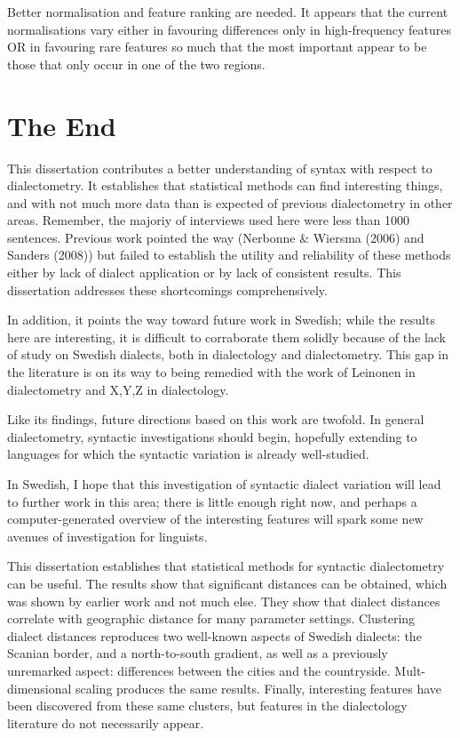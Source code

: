Better normalisation and feature ranking are needed. It appears that
the current normalisations vary either in favouring differences
only in high-frequency features OR in favouring rare features so much
that the most important appear to be those that only occur in one of
the two regions.

\section{The End}

This dissertation contributes a better understanding of syntax with
respect to dialectometry. It establishes that statistical methods can
find interesting things, and with not much more data than is expected
of previous dialectometry in other areas. Remember, the majoriy of
interviews used here were less than 1000 sentences. Previous work
pointed the way (Nerbonne \& Wiersma (2006) and Sanders (2008)) but
failed to establish the utility and reliability of these methods
either by lack of dialect application or by lack of consistent
results. This dissertation addresses these shortcomings
comprehensively.

In addition, it points the way toward future work in Swedish; while
the results here are interesting, it is difficult to corraborate them
solidly because of the lack of study on Swedish dialects, both in
dialectology and dialectometry. This gap in the literature is on its
way to being remedied with the work of Leinonen in dialectometry and
X,Y,Z in dialectology.

Like its findings, future directions based on this work are
twofold. In general dialectometry, syntactic investigations should
begin, hopefully extending to languages for which the syntactic
variation is already well-studied.

In Swedish, I hope that this investigation of syntactic dialect
variation will lead to further work in this area; there is little
enough right now, and perhaps a computer-generated overview of the
interesting features will spark some new avenues of investigation for
linguists.


This dissertation establishes that statistical methods for syntactic
dialectometry can be useful. The results show that significant
distances can be obtained, which was shown by earlier work and not
much else. They show that dialect distances correlate with geographic
distance for many parameter settings. Clustering dialect distances
reproduces two well-known aspects of Swedish dialects: the Scanian
border, and a north-to-south gradient, as well as a previously unremarked
aspect: differences between the cities and the
countryside. Mult-dimensional scaling produces the same
results. Finally, interesting features have been discovered from these
same clusters, but features in the dialectology literature do not
necessarily appear.


